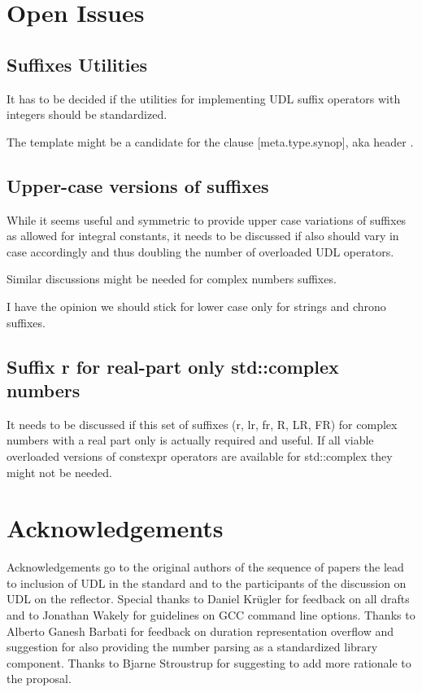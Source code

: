 \documentclass[ebook,11pt,article]{memoir}
\begin{document}
\section{Open Issues}
\subsection{Suffixes Utilities}
It has to be decided if the utilities for implementing UDL suffix operators with integers should be standardized.

The template  might be a candidate for the clause [meta.type.synop], aka header .

\subsection{Upper-case versions of suffixes}
While it seems useful and symmetric to provide upper case variations of suffixes  as allowed for integral constants, it needs to be discussed if also  should vary in case accordingly and thus doubling the number of overloaded UDL operators.

Similar discussions might be needed for complex numbers suffixes.

I have the opinion we should stick for lower case only for strings and chrono suffixes. 

\subsection{Suffix r for real-part only std::complex numbers}
It needs to be discussed if this set of suffixes (r, lr, fr, R, LR, FR) for complex numbers with a real part only is actually required and useful. If all viable overloaded versions of constexpr operators are available for std::complex they might not be needed.

\section{Acknowledgements}
Acknowledgements go to the original authors of the sequence of papers the lead to inclusion of UDL in the standard and to the participants of the discussion on UDL on the reflector. Special thanks to Daniel Kr\"ugler for feedback on all drafts and to Jonathan Wakely for guidelines on GCC command line options. Thanks to Alberto Ganesh Barbati for feedback on duration representation overflow and suggestion for also providing the number parsing as a standardized library component. Thanks to Bjarne Stroustrup for suggesting to add more rationale to the proposal.
\end{document}
